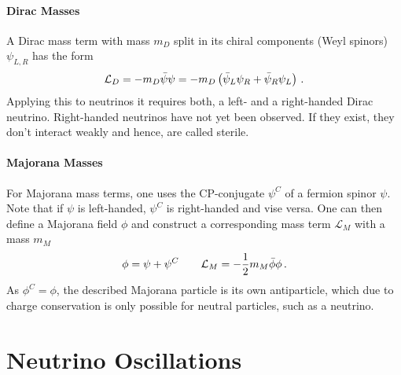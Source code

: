     \paragraph{Dirac Masses}
    A Dirac mass term with mass $m_D$ split in its chiral components (Weyl spinors) $\psi_{L,R}$ has the form
    \begin{equation}
        \mathcal{L}_D =  -m_D \bar\psi\psi = -m_D \left(\bar\psi_L\psi_R + \bar\psi_R\psi_L \right) \text{\,.}
    \end{equation}
    Applying this to neutrinos it requires both, a left- and a right-handed Dirac neutrino. Right-handed neutrinos have not yet been observed. If they exist, they don't interact weakly and hence, are called sterile.
    \paragraph{Majorana Masses}
    For Majorana mass terms, one uses the CP-conjugate $\psi^C$ of a fermion spinor $\psi$. Note that if $\psi$ is left-handed, $\psi^C$ is right-handed and vise versa. One can then define a Majorana field $\phi$ and construct a corresponding mass term $\mathcal{L}_M$ with a mass $m_M$
    \begin{equation}
        \phi = \psi + \psi^C \qquad \mathcal{L}_M = -\frac{1}{2}m_M \bar\phi \phi \text{\,.}
    \end{equation}
    As $\phi^C=\phi$, the described Majorana particle is its own antiparticle, which due to charge conservation is only possible for neutral particles, such as a neutrino.
    
    \section{Neutrino Oscillations}
